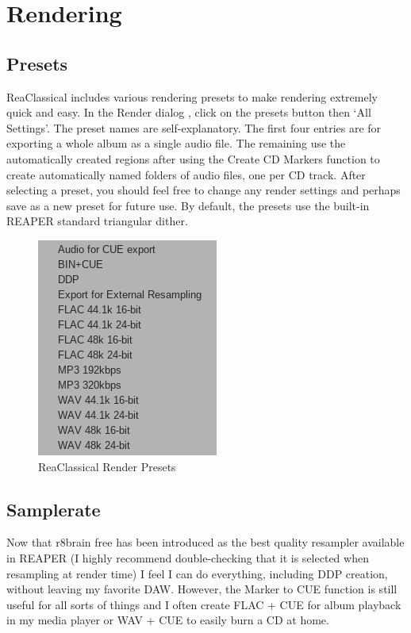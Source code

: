 \documentclass[10pt,american]{article}
\begin{document}
\section{Rendering}

\subsection{Presets}

ReaClassical includes various rendering presets to make rendering extremely
quick and easy. In the Render dialog , click on the presets button then
`All Settings'. The preset names are self-explanatory. The first four entries
are for exporting a whole album as a single audio file. The remaining use the
automatically created regions after using the Create CD Markers function
 to create automatically named folders of audio files, one per CD track.
After selecting a preset, you should feel free to change any render settings and
perhaps save as a new preset for future use. By default, the presets use the
built-in REAPER standard triangular dither.

\begin{figure}
\begin{centering}
\includegraphics[scale=0.75]{user_guide_images/render_presets}
\par\end{centering}
\caption{ReaClassical Render Presets}

\end{figure}


\subsection{Samplerate}

Now that r8brain free has been introduced as the best quality resampler
available in REAPER (I highly recommend double-checking that it is selected when
resampling at render time) I feel I can do everything, including DDP creation,
without leaving my favorite DAW. However, the Marker to CUE function  is
still useful for all sorts of things and I often create FLAC + CUE for album
playback in my media player or WAV + CUE to easily burn a CD at home.
\end{document}
